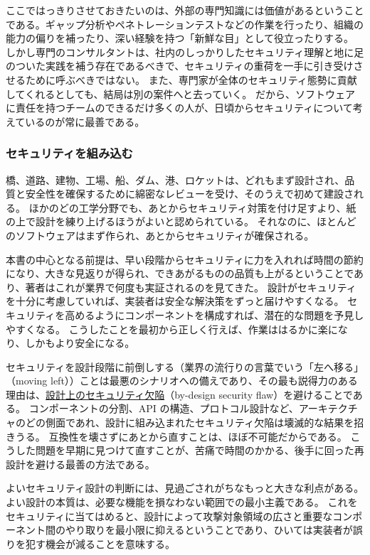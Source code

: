 \documentclass[uplatex]{jsarticle}
\begin{document}
ここではっきりさせておきたいのは、外部の専門知識には価値があるということである。ギャップ分析やペネトレーションテストなどの作業を行ったり、組織の能力の偏りを補ったり、深い経験を持つ「新鮮な目」として役立ったりする。
しかし専門のコンサルタントは、社内のしっかりしたセキュリティ理解と地に足のついた実践を補う存在であるべきで、セキュリティの重荷を一手に引き受けさせるために呼ぶべきではない。
また、専門家が全体のセキュリティ態勢に貢献してくれるとしても、結局は別の案件へと去っていく。
だから、ソフトウェアに責任を持つチームのできるだけ多くの人が、日頃からセキュリティについて考えているのが常に最善である。

\subsubsection{セキュリティを組み込む}

橋、道路、建物、工場、船、ダム、港、ロケットは、どれもまず設計され、品質と安全性を確保するために綿密なレビューを受け、そのうえで初めて建設される。
ほかのどの工学分野でも、あとからセキュリティ対策を付け足すより、紙の上で設計を練り上げるほうがよいと認められている。
それなのに、ほとんどのソフトウェアはまず作られ、あとからセキュリティが確保される。

本書の中心となる前提は、早い段階からセキュリティに力を入れれば時間の節約になり、大きな見返りが得られ、できあがるものの品質も上がるということであり、著者はこれが業界で何度も実証されるのを見てきた。
設計がセキュリティを十分に考慮していれば、実装者は安全な解決策をずっと届けやすくなる。
セキュリティを高めるようにコンポーネントを構成すれば、潜在的な問題を予見しやすくなる。
こうしたことを最初から正しく行えば、作業ははるかに楽になり、しかもより安全になる。

セキュリティを設計段階に前倒しする（業界の流行りの言葉でいう「左へ移る」（moving left））ことは最悪のシナリオへの備えであり、その最も説得力のある理由は、\underline{設計上のセキュリティ欠陥}（by-design security flaw）を避けることである。
コンポーネントの分割、API の構造、プロトコル設計など、アーキテクチャのどの側面であれ、設計に組み込まれたセキュリティ欠陥は壊滅的な結果を招きうる。
互換性を壊さずにあとから直すことは、ほぼ不可能だからである。
こうした問題を早期に見つけて直すことが、苦痛で時間のかかる、後手に回った再設計を避ける最善の方法である。

よいセキュリティ設計の判断には、見過ごされがちなもっと大きな利点がある。
よい設計の本質は、必要な機能を損なわない範囲での最小主義である。
これをセキュリティに当てはめると、設計によって攻撃対象領域の広さと重要なコンポーネント間のやり取りを最小限に抑えるということであり、ひいては実装者が誤りを犯す機会が減ることを意味する。
\end{document}

